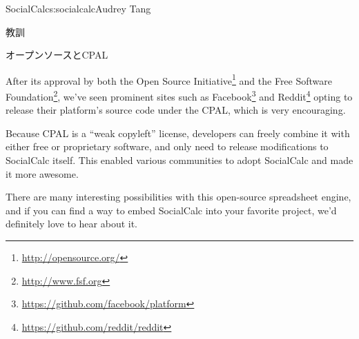 \begin{aosachapter}{SocialCalc}{s:socialcalc}{Audrey Tang}
\begin{aosasect1}{教訓}
\begin{aosasect2}{オープンソースとCPAL}

After its approval by both the Open Source
Initiative\footnote{\url{http://opensource.org/}} and the Free
Software Foundation\footnote{\url{http://www.fsf.org}}, we've seen prominent
sites such as Facebook\footnote{\url{https://github.com/facebook/platform}}
and Reddit\footnote{\url{https://github.com/reddit/reddit}} opting to release
their platform's source code under the CPAL, which is very
encouraging.


Because CPAL is a ``weak copyleft'' license, developers can freely
combine it with either free or proprietary software, and only need to
release modifications to SocialCalc itself.  This enabled various
communities to adopt SocialCalc and made it more awesome.


There are many interesting possibilities with this open-source
spreadsheet engine, and if you can find a way to embed SocialCalc
into your favorite project, we'd definitely love to hear about it.

\end{aosasect2}

\end{aosasect1}

\end{aosachapter}
